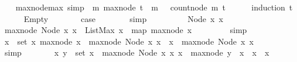 \begin{isabellebody}
%
\endisatagproof
{\isafoldproof}%
%
\isadelimproof
\isanewline
%
\endisadelimproof
\ \ \isanewline
{}\isamarkupfalse%
\ max{\isacharunderscore}node{\isacharunderscore}max\ {\isacharbrackleft}simp{\isacharbrackright}{\isacharcolon}\ {\isachardoublequoteopen}{\isasymforall}\ m{\isachardot}\ max{\isacharunderscore}node\ t\ {\isacharless}\ m\ \ {\isasymlongrightarrow}\ count{\isacharunderscore}node\ m\ t\ {\isacharequal}\ {}{\isachardoublequoteclose}\isanewline
%
\isadelimproof
\ \ %
\endisadelimproof
%
\isatagproof
{}\isamarkupfalse%
\ {\isacharparenleft}induction\ t{\isacharparenright}\isanewline
\ \ \ \ \isamarkupfalse%
\ Empty\isanewline
\ \ \ \ \isamarkupfalse%
\ \isamarkupfalse%
\ {\isacharquery}case\isanewline
\ \ \ \ \ \ \isamarkupfalse%
\ simp\ \isanewline
\ \ \isamarkupfalse%
\isanewline
\ \ \ \ \isamarkupfalse%
\ {\isacharparenleft}Node\ x{}\ x{}{\isacharparenright}\isanewline
\ \ \ \ \isamarkupfalse%
\ {\isachardoublequoteopen}max{\isacharunderscore}node\ {\isacharparenleft}Node\ x{}\ x{}{\isacharparenright}\ {\isacharequal}\ ListMax\ {\isacharparenleft}x{}\ {\isacharhash}\ {\isacharparenleft}map\ max{\isacharunderscore}node\ x{}{\isacharparenright}{\isacharparenright}{\isachardoublequoteclose}\ \isanewline
\ \ \ \ \ \ \isamarkupfalse%
\ simp\isanewline
\ \ \ \ \isamarkupfalse%
\ \isamarkupfalse%
\ {\isachardoublequoteopen}{\isasymforall}x\ {\isasymin}\ set\ x{}{\isachardot}\ max{\isacharunderscore}node\ x\ {\isasymle}\ max{\isacharunderscore}node\ {\isacharparenleft}Node\ x{}\ x{}{\isacharparenright}\ {\isasymand}\ x{}\ {\isasymle}\ max{\isacharunderscore}node\ {\isacharparenleft}Node\ x{}\ x{}{\isacharparenright}{\isachardoublequoteclose}\isanewline
\ \ \ \ \ \ \isamarkupfalse%
\ simp\isanewline
\ \ \ \ \isamarkupfalse%
\ \isamarkupfalse%
\ {\isachardoublequoteopen}{\isasymforall}x{\isachardot}\ {\isasymforall}y\ {\isasymin}\ set\ x{}\ {\isachardot}\ max{\isacharunderscore}node\ {\isacharparenleft}Node\ x{}\ x{}{\isacharparenright}{\isacharless}\ x\ {\isasymlongrightarrow}\ max{\isacharunderscore}node\ y\ {\isacharless}\ x\ {\isasymand}\ x{}\ {\isacharless}\ x{\isachardoublequoteclose}\isanewline
\ \ \ \ \ \ \isamarkupfalse%

\end{isabellebody}
